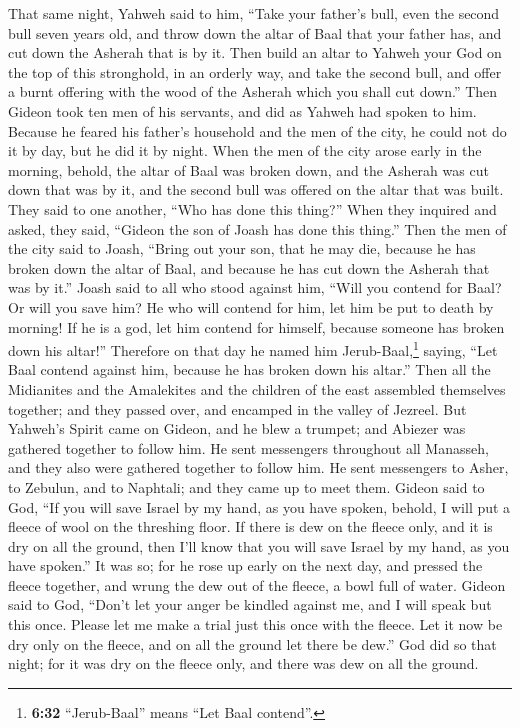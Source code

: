 That same night, Yahweh said to him, ``Take your
father's bull, even the second bull seven years old, and throw down the
altar of Baal that your father has, and cut down the Asherah that is by
it.  Then build an altar to Yahweh your God on the top of
this stronghold, in an orderly way, and take the second bull, and offer
a burnt offering with the wood of the Asherah which you shall cut
down.''  Then Gideon took ten men of his servants, and
did as Yahweh had spoken to him. Because he feared his father's
household and the men of the city, he could not do it by day, but he did
it by night.  When the men of the city arose early in the
morning, behold, the altar of Baal was broken down, and the Asherah was
cut down that was by it, and the second bull was offered on the altar
that was built.  They said to one another, ``Who has done
this thing?'' When they inquired and asked, they said, ``Gideon the son
of Joash has done this thing.''  Then the men of the city
said to Joash, ``Bring out your son, that he may die, because he has
broken down the altar of Baal, and because he has cut down the Asherah
that was by it.''  Joash said to all who stood against
him, ``Will you contend for Baal? Or will you save him? He who will
contend for him, let him be put to death by morning! If he is a god, let
him contend for himself, because someone has broken down his altar!''
 Therefore on that day he named him
Jerub-Baal,\footnote{\textbf{6:32} ``Jerub-Baal'' means ``Let Baal
  contend''.} saying, ``Let Baal contend against him, because he has
broken down his altar.''  Then all the Midianites and the
Amalekites and the children of the east assembled themselves together;
and they passed over, and encamped in the valley of Jezreel.
 But Yahweh's Spirit came on Gideon, and he blew a
trumpet; and Abiezer was gathered together to follow him.
 He sent messengers throughout all Manasseh, and they
also were gathered together to follow him. He sent messengers to Asher,
to Zebulun, and to Naphtali; and they came up to meet them.
 Gideon said to God, ``If you will save Israel by my
hand, as you have spoken,  behold, I will put a fleece of
wool on the threshing floor. If there is dew on the fleece only, and it
is dry on all the ground, then I'll know that you will save Israel by my
hand, as you have spoken.''  It was so; for he rose up
early on the next day, and pressed the fleece together, and wrung the
dew out of the fleece, a bowl full of water.  Gideon said
to God, ``Don't let your anger be kindled against me, and I will speak
but this once. Please let me make a trial just this once with the
fleece. Let it now be dry only on the fleece, and on all the ground let
there be dew.''  God did so that night; for it was dry on
the fleece only, and there was dew on all the ground.

